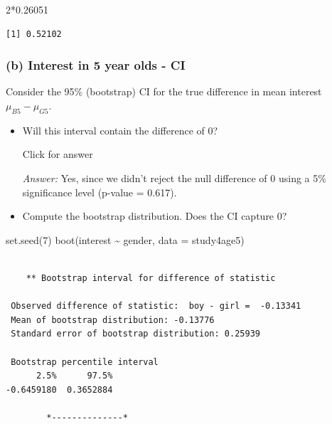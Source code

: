 \documentclass[
]{book}
\newenvironment{Shaded}{\begin{snugshade}}{\end{snugshade}}
\newcommand{\AttributeTok}[1]{\textcolor[rgb]{0.77,0.63,0.00}{#1}}
\newcommand{\DecValTok}[1]{\textcolor[rgb]{0.00,0.00,0.81}{#1}}
\newcommand{\FloatTok}[1]{\textcolor[rgb]{0.00,0.00,0.81}{#1}}
\newcommand{\FunctionTok}[1]{\textcolor[rgb]{0.00,0.00,0.00}{#1}}
\newcommand{\NormalTok}[1]{#1}
\newcommand{\SpecialCharTok}[1]{\textcolor[rgb]{0.00,0.00,0.00}{#1}}
\begin{document}
\begin{Shaded}
\begin{Highlighting}[]
\DecValTok{2}\SpecialCharTok{*}\FloatTok{0.26051} 
\end{Highlighting}
\end{Shaded}

\begin{verbatim}
[1] 0.52102
\end{verbatim}

\vspace*{.5in}

\hypertarget{b-interest-in-5-year-olds---ci}{%
\subsubsection{(b) Interest in 5 year olds - CI}\label{b-interest-in-5-year-olds---ci}}

Consider the 95\% (bootstrap) CI for the true difference in mean interest \(\mu_{B5} - \mu_{G5}\).

\begin{itemize}
\item
  Will this interval contain the difference of 0?

  Click for answer

  \emph{Answer:} Yes, since we didn't reject the null difference of 0 using a 5\% significance level (p-value = 0.617).
\item
  Compute the bootstrap distribution. Does the CI capture 0?
\end{itemize}

\begin{Shaded}
\begin{Highlighting}[]
\FunctionTok{set.seed}\NormalTok{(}\DecValTok{7}\NormalTok{)}
\FunctionTok{boot}\NormalTok{(interest }\SpecialCharTok{\textasciitilde{}}\NormalTok{ gender, }\AttributeTok{data =}\NormalTok{ study4age5)}
\end{Highlighting}
\end{Shaded}

\begin{verbatim}

    ** Bootstrap interval for difference of statistic

 Observed difference of statistic:  boy - girl =  -0.13341 
 Mean of bootstrap distribution: -0.13776 
 Standard error of bootstrap distribution: 0.25939 

 Bootstrap percentile interval
      2.5%      97.5% 
-0.6459180  0.3652884 

        *--------------*
\end{verbatim}
\end{document}
